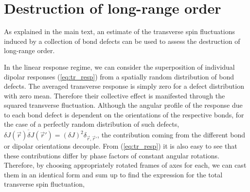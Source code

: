 \documentclass[twocolumn,english,aps,prl,floatfix]{revtex4-1}
\begin{document}

\section{Destruction of long-range order}

As explained in the main text, an estimate of the transverse spin 
fluctuations induced by a collection of bond defects can be used to 
assess the destruction of long-range order.

In the linear response regime, we can consider the superposition of
individual dipolar responses (\ref{eq:tr_resp}) from a spatially
random distribution of bond defects. The averaged transverse response
is simply zero for a defect distribution with zero mean. Therefore 
their collective effect is manifested through the squared transverse
fluctuation. Although the angular profile of the response due 
to each bond defect is dependent on the orientations
of the respective bonds, for the case of a perfectly random 
distribution of such defects, 
$\overline{\delta J(\vec{r})\delta J(\vec{r}')}=
(\delta J)^2\delta_{\vec{r},\vec{r}'}$, the contribution coming
from the different bond or dipolar orientations decouple. From
(\ref{eq:tr_resp}) it is also easy to see that these contributions
differ by phase factors of constant angular rotations. Therefore, by 
choosing appropriately rotated frames of axes for each, we can cast 
them in an identical form and sum up to find the expression for the 
total transverse spin fluctuation,
\end{document}
